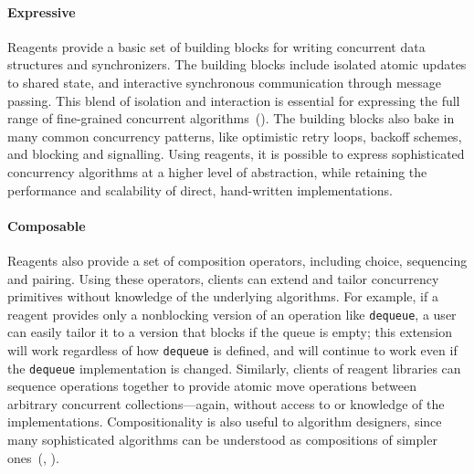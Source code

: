 \documentclass[preprint,nocopyrightspace]{sigplanconf}
\begin{document}



\paragraph{Expressive}  
Reagents provide a basic set of building blocks for writing concurrent data
structures and synchronizers.  The building blocks include isolated atomic
updates to shared state, and interactive synchronous communication through
message passing.  This blend of isolation and interaction is essential for
expressing the full range of fine-grained concurrent
algorithms~().  The building blocks also bake in many common
concurrency patterns, like optimistic retry loops, backoff schemes, and blocking
and signalling.  Using reagents, it is possible to express sophisticated
concurrency algorithms at a higher level of abstraction, while retaining the
performance and scalability of direct, hand-written implementations.

\paragraph{Composable}
Reagents also provide a set of composition operators, including choice,
sequencing and pairing.  Using these operators, clients can extend and tailor
concurrency primitives without knowledge of the underlying algorithms.  For
example, if a reagent provides only a nonblocking version of an operation like
\lstinline{dequeue}, a user can easily tailor it to a version that blocks if the
queue is empty; this extension will work regardless of how \lstinline{dequeue}
is defined, and will continue to work even if the \lstinline{dequeue}
implementation is changed.  Similarly, clients of reagent libraries can sequence
operations together to provide atomic move operations between arbitrary
concurrent collections---again, without access to or knowledge of the
implementations.  Compositionality is also useful to algorithm designers, since
many sophisticated algorithms can be understood as compositions of simpler
ones~(, ).
\end{document}
